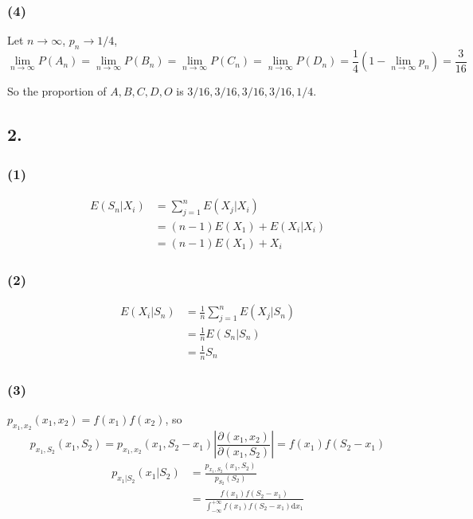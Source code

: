 \documentclass{article}
\begin{document}
\subsubsection*{(4)}

Let $n\rightarrow \infty$, $p_{n}\rightarrow 1/4$, 
$$\lim_{n\rightarrow\infty}P(A_{n})=\lim_{n\rightarrow\infty}P(B_{n})=\lim_{n\rightarrow\infty}P(C_{n})=\lim_{n\rightarrow\infty}P(D_{n})=\frac{1}{4}(1-\lim_{n\rightarrow\infty}p_{{n}})=\frac{3}{16}$$

So the proportion of $A,B,C,D,O$ is $3/16,3/16,3/16,3/16,1/4$.

\subsection*{2.}

\subsubsection*{(1)}
\begin{align*}
E(S_{n}|X_{i})&=\sum_{j=1}^{n}E(X_{j}|X_{i})\\
&=(n-1)E(X_{1})+E(X_{i}|X_{i})\\
&=(n-1)E(X_{1})+X_{i}
\end{align*}

\subsubsection*{(2)}
\begin{align*}
E(X_{i}|S_{n})&=\frac{1}{n}\sum_{j=1}^{n}E(X_{j}|S_{n})\\
&=\frac{1}{n}E(S_{n}|S_{n})\\
&=\frac{1}{n}S_{n}
\end{align*}

\subsubsection*{(3)}

$p_{x_{1},x_{2}}(x_{1},x_{2})=f(x_{1})f(x_{2})$, so
$$p_{x_{1},S_{2}}(x_{1},S_{2})=p_{x_{1},x_{2}}(x_{1},S_{2}-x_{1})\left|\frac{\partial(x_{1},x_{2})}{\partial(x_{1},S_{2})}\right|=f(x_{1})f(S_{2}-x_{1})$$
\begin{align*}
p_{x_{1}|S_{2}}(x_{1}|S_{2})&=\frac{p_{x_{1},S_{2}}(x_{1},S_{2})}{p_{S_{2}}(S_{2})}\\
&=\frac{f(x_{1})f(S_{2}-x_{1})}{\int_{-\infty}^{+\infty}f(x_{1})f(S_{2}-x_{1})\mathrm{d}x_{1}}
\end{align*}
\end{document}
